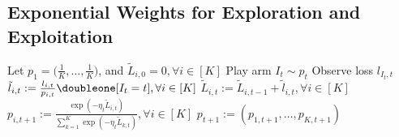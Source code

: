 \subsection{Exponential Weights for Exploration and Exploitation} %

\begin{alg}[Exp3] \leavevmode
    \begin{framed}
        \begin{algorithmic}
            \State Let $p_1=\big(\frac{1}{K},\dots,\frac{1}{K}\big)$,
                and $\tilde L_{i,0}=0, \forall i\in [K]$
                \State Play arm $I_t\sim p_t$
                \State Observe loss $l_{I_t, t}$
                \State $\tilde l_{i,t}:=\frac{l_{i,t}}{p_{i,t}}\doubleone[I_t=t], \forall i\in[K]$
                \State $\tilde L_{i,t} := \tilde L_{i,t-1} + \tilde l_{i,t}, \forall i\in[K]$
                \State $p_{i,t+1}:=\frac{\exp(-\eta_t\tilde L_{i,t})}{\sum_{k=1}^K \exp(-\eta_t\tilde L_{k,t})}, \forall i\in[K]$
                \State $p_{t+1} := (p_{1,t+1},\dots,p_{K,t+1})$
            \EndFor
        \end{algorithmic}
    \end{framed}
\end{alg}


